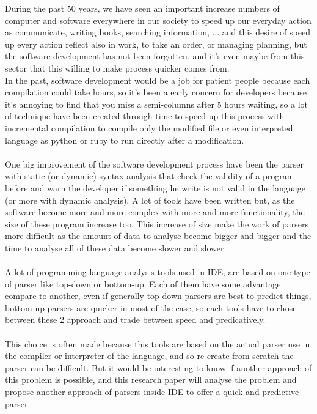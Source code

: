 During the past 50 years, we have seen an important increase numbers of computer and software everywhere in our society to speed up our everyday action as communicate, writing books, searching information, ... and this desire of speed up every action reflect also in work, to take an order, or managing planning, but the software development has not been forgotten, and it's even maybe from this sector that this willing to make process quicker comes from.
\\
In the past, software development would be a job for patient people because each compilation could take hours, so it's been a early concern for developers because it's annoying to find that you miss a semi-columns after 5 hours waiting, so a lot of technique have been created through time to speed up this process with incremental compilation to compile only the modified file or even interpreted language as python or ruby to run directly after a modification.
\\
\\
One big improvement of the software development process have been the parser with static (or dynamic) syntax analysis that check the validity of a program before and warn the developer if something he write is not valid in the language (or more with dynamic analysis). A lot of tools have been written but, as the software become more and more complex with more and more functionality, the size of these program increase too. This increase of size make the work of parsers more difficult as the amount of data to analyse become bigger and bigger and the time to analyse all of these data become slower and slower.
\\
\\
A lot of programming language analysis tools used in IDE, are based on one type of parser like top-down or bottom-up. Each of them have some advantage compare to another, even if generally top-down parsers are best to predict things, bottom-up parsers are quicker in most of the case, so each tools have to chose between these 2 approach and trade between speed and predicatively.
\\
\\
This choice is often made because this tools are based on the actual parser use in the compiler or interpreter of the language, and so re-create from scratch the parser can be difficult.
But it would be interesting to know if another approach of this problem is possible, and this research paper will analyse the problem and propose another approach of parsers inside IDE to offer a quick and predictive parser.
